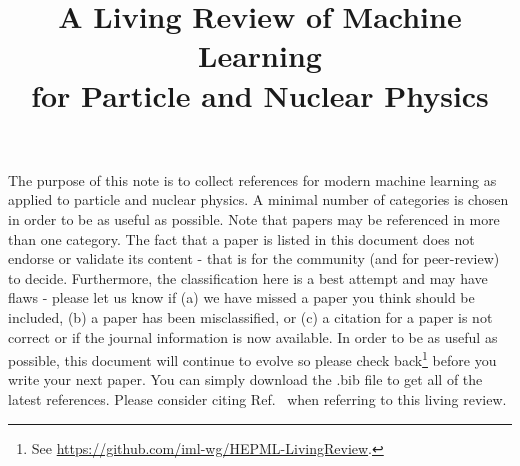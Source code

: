 \documentclass[12pt,letterpaper]{article}
\title{\boldmath A Living Review of Machine Learning \\  for Particle and Nuclear Physics}
\begin{document}
\maketitle

The purpose of this note is to collect references for modern machine learning as applied to particle and nuclear physics.  A minimal number of categories is chosen in order to be as useful as possible.  Note that papers may be referenced in more than one category.  The fact that a paper is listed in this document does not endorse or validate its content - that is for the community (and for peer-review) to decide.  Furthermore, the classification here is a best attempt and may have flaws - please let us know if (a) we have missed a paper you think should be included, (b) a paper has been misclassified, or (c) a citation for a paper is not correct or if the journal information is now available.  In order to be as useful as possible, this document will continue to evolve so please check back\footnote{See \href{https://github.com/iml-wg/HEPML-LivingReview}{https://github.com/iml-wg/HEPML-LivingReview}.} before you write your next paper.  You can simply download the .bib file to get all of the latest references.  Please consider citing Ref.~\cite{Feickert:2021ajf} when referring to this living review.
\end{document}
